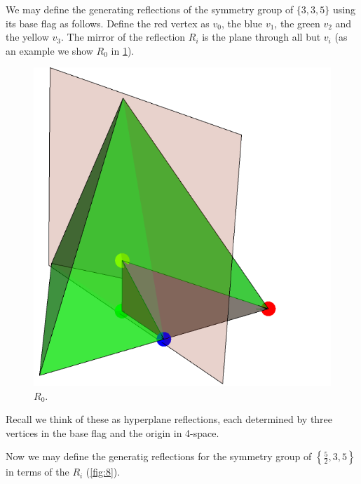 \documentclass{article}
\theoremstyle{definition}
\begin{document}
	We may define the generating reflections of the symmetry group of $\{3,3,5\}$ using its base flag as follows. Define the red vertex as $v_0$, the blue $v_1$, the green $v_2$ and the yellow $v_3$. The mirror of the reflection $R_i$ is the plane through all but $v_i$ (as an example we show $R_0$ in \cref{fig:7}).
	
	\begin{figure}[H]
		\centering
		\includegraphics[width=.3\linewidth]{fig7}
		\caption{$R_0$.}\label{fig:7}
	\end{figure}
	
	Recall we think of these as hyperplane reflections, each determined by three vertices in the base flag and the origin in 4-space.
	
	Now we may define the generatig reflections for the symmetry group of $\left\{\frac{5}{2},3,5\right\}$ in terms of the $R_i$ (\cref{fig:8}).
	
\end{document}
